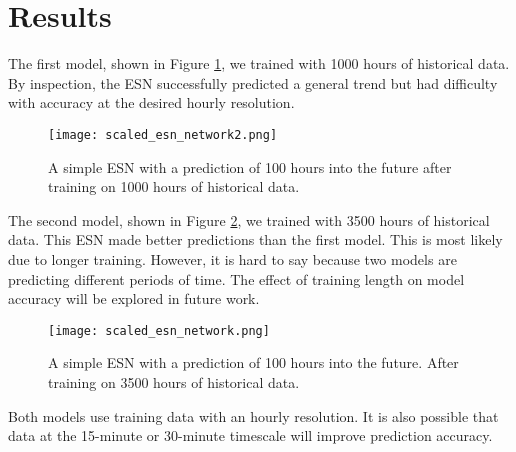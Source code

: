 \section{Results}

The first model, shown in Figure \ref{fig:ESN1}, we trained with 1000 hours of
historical data. By inspection, the \gls{ESN} successfully predicted a general
trend but had difficulty with accuracy at the desired hourly resolution.

\begin{figure}[h]
  \centering
  \texttt{[image: scaled\_esn\_network2.png]}
  \caption{A simple ESN with a prediction of 100 hours into the future after
  training on 1000 hours of historical data.}
  \label{fig:ESN1}
\end{figure}

The second model, shown in Figure \ref{fig:ESN2}, we trained with 3500 hours of
historical data. This \gls{ESN} made better predictions than the first model.
This is most likely due to longer training. However, it is hard to say because
two models are predicting different periods of time. The effect of training
length on model accuracy will be explored in future work.

\begin{figure}[h]
  \centering
  \texttt{[image: scaled\_esn\_network.png]}
  \caption{A simple ESN with a prediction of 100 hours into the future. After
  training on 3500 hours of historical data.}
  \label{fig:ESN2}
\end{figure}

Both models use training data with an hourly resolution. It is also possible
that data at the 15-minute or 30-minute timescale will improve prediction
accuracy.
